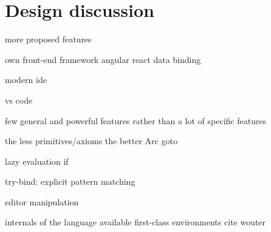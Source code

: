 \chapter{Design discussion}\label{chap:design}

more proposed features

own front-end framework
angular
react
data binding

modern ide

vs code

few general and powerful features
rather than a lot of specific features

the less primitives/axioms the better
Arc
goto

lazy evaluation
    if
    
    
try-bind: explicit pattern matching

editor manipulation

internals of the language available
    first-class environments
    cite wouter
    
